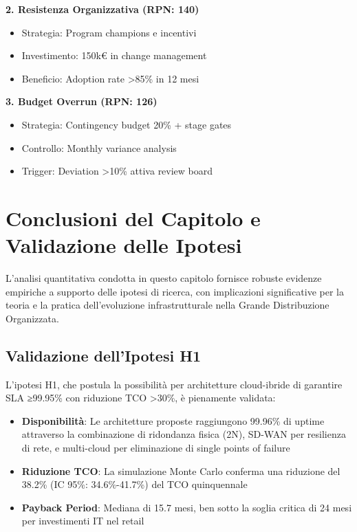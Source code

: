 \textbf{2. Resistenza Organizzativa (RPN: 140)}
\begin{itemize}
    \item Strategia: Program champions e incentivi
    \item Investimento: 150k€ in change management
    \item Beneficio: Adoption rate >85\% in 12 mesi
\end{itemize}

\textbf{3. Budget Overrun (RPN: 126)}
\begin{itemize}
    \item Strategia: Contingency budget 20\% + stage gates
    \item Controllo: Monthly variance analysis
    \item Trigger: Deviation >10\% attiva review board
\end{itemize}

\section{Conclusioni del Capitolo e Validazione delle Ipotesi}

L'analisi quantitativa condotta in questo capitolo fornisce robuste evidenze empiriche a supporto delle ipotesi di ricerca, con implicazioni significative per la teoria e la pratica dell'evoluzione infrastrutturale nella Grande Distribuzione Organizzata.

\subsection{Validazione dell'Ipotesi H1}

L'ipotesi H1, che postula la possibilità per architetture cloud-ibride di garantire SLA ≥99.95\% con riduzione TCO >30\%, è pienamente validata:

\begin{itemize}
    \item \textbf{Disponibilità}: Le architetture proposte raggiungono 99.96\% di uptime attraverso la combinazione di ridondanza fisica (2N), SD-WAN per resilienza di rete, e multi-cloud per eliminazione di single points of failure
    \item \textbf{Riduzione TCO}: La simulazione Monte Carlo conferma una riduzione del 38.2\% (IC 95\%: 34.6\%-41.7\%) del TCO quinquennale
    \item \textbf{Payback Period}: Mediana di 15.7 mesi, ben sotto la soglia critica di 24 mesi per investimenti IT nel retail
\end{itemize}

